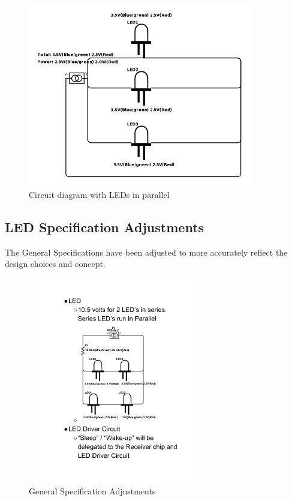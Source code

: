 \documentclass[12pt]{article}
\begin{document}
{{{{			\begin{figure}[!htb]
				\centering
				\includegraphics[height = 80mm]{assets/ParallelLED.jpg}
				\caption{Circuit diagram with LEDs in parallel \label{overflow}}
			\end{figure}
		
		\subsection{LED Specification Adjustments}
			The General Specifications have been adjusted to more accurately reflect the design choices and concept.		
			\begin{figure}[!htb]
				\centering
				\includegraphics[width = 80mm, height = 90mm]{assets/3_General_Specifications.pdf}
				\caption{General Specification Adjustments \label{overflow}}
			\end{figure}
		
}}}}
\end{document}
